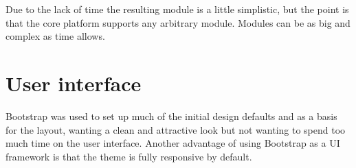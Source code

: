 Due to the lack of time the resulting module is a little simplistic, but the point is that the core platform supports any arbitrary module. Modules can be as big and complex as time allows.

\section{User interface}

Bootstrap was used to set up much of the initial design defaults and as a basis for the layout, wanting a clean and attractive look but not wanting to spend too much time on the user interface. Another advantage of using Bootstrap as a UI framework is that the theme is fully responsive by default.